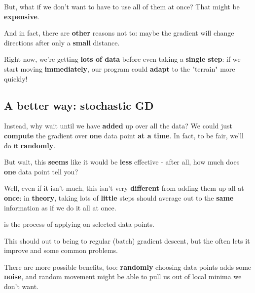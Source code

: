         But, what if we don't want to have to use all of them at once? That might be \textbf{expensive}. 
        
        And in fact, there are \textbf{other} reasons not to: maybe the gradient will change directions after only a \textbf{small} distance. 
        
        Right now, we're getting \textbf{lots of data} before even taking a \textbf{single step}: if we start moving \textbf{immediately}, our program could \textbf{adapt} to the "terrain" more quickly!
        
    \subsection{A better way: stochastic GD}
        
        Instead, why wait until we have \textbf{added} up over all the data? We could just \textbf{compute} the gradient over \textbf{one} data point \textbf{at a time}. In fact, to be fair, we'll do it \textbf{randomly}. 
        
        But wait, this \textbf{seems} like it would be \textbf{less} effective - after all, how much does \textbf{one} data point tell you? 
        
        Well, even if it isn't much, this isn't very \textbf{different} from adding them up all at \textbf{once}: in \textbf{theory}, taking lots of \textbf{little} steps should average out to the \textbf{same} information as if we do it all at once.\\
        
        \begin{definition}
             is the process of applying  on  selected data points.
            
            This should  out to being  to regular (batch) gradient descent, but the  often lets it improve  and  some common problems.
        \end{definition}
            
        
        There are more possible benefits, too: \textbf{randomly} choosing data points adds some \textbf{noise}, and random movement might be able to pull us out of local minima we don't want.
            
